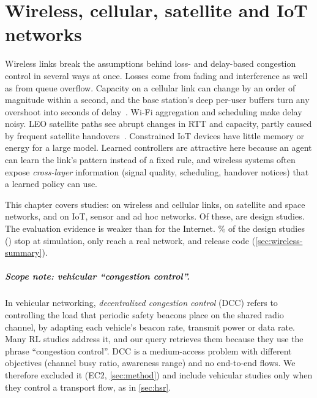 \chapter{Wireless, cellular, satellite and IoT networks}
\label{ch:wireless}

Wireless links break the assumptions behind loss- and delay-based congestion control in several ways at once. Losses come from fading and interference as well as from queue overflow. Capacity on a cellular link can change by an order of magnitude within a second, and the base station's deep per-user buffers turn any overshoot into seconds of delay~\cite{winstein2013sprout}. Wi-Fi aggregation and scheduling make delay noisy. LEO satellite paths see abrupt changes in RTT and capacity, partly caused by frequent satellite handovers~\cite{michel2022starlink}. Constrained IoT devices have little memory or energy for a large model. Learned controllers are attractive here because an agent can learn the link's pattern instead of a fixed rule, and wireless systems often expose \emph{cross-layer} information (signal quality, scheduling, handover notices) that a learned policy can use.

This chapter covers \nChWirelessN{} studies: \nSetCell{} on wireless and cellular links, \nSetSat{} on satellite and space networks, and \nSetIot{} on IoT, sensor and ad hoc networks. Of these, \nChWirelessDesign{} are design studies. The evaluation evidence is weaker than for the Internet. \nChWirelessPctSim\% of the design studies (\nChWirelessSim) stop at simulation, only \nChWirelessReal{} reach a real network, and \nChWirelessCode{} release code (\cref{sec:wireless-summary}).

\paragraph{Scope note: vehicular ``congestion control''.} In vehicular networking, \emph{decentralized congestion control} (DCC) refers to controlling the load that periodic safety beacons place on the shared radio channel, by adapting each vehicle's beacon rate, transmit power or data rate. Many RL studies address it, and our query retrieves them because they use the phrase ``congestion control''. DCC is a medium-access problem with different objectives (channel busy ratio, awareness range) and no end-to-end flows. We therefore excluded it (EC2, \cref{sec:method}) and include vehicular studies only when they control a transport flow, as in \cref{sec:hsr}.


